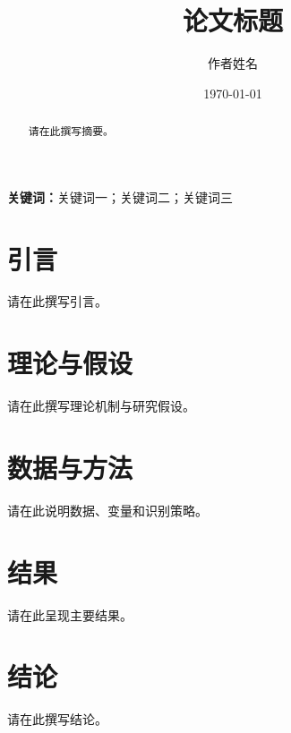 \documentclass[UTF8,12pt]{ctexart}
\title{论文标题}
\author{作者姓名}
\date{\today}
\begin{document}
\maketitle

\begin{abstract}
请在此撰写摘要。
\end{abstract}

\noindent\textbf{关键词：}关键词一；关键词二；关键词三

\section{引言}

请在此撰写引言。

\section{理论与假设}

请在此撰写理论机制与研究假设。

\section{数据与方法}

请在此说明数据、变量和识别策略。

\section{结果}

请在此呈现主要结果。

\section{结论}

请在此撰写结论。

% 
% 
\end{document}
